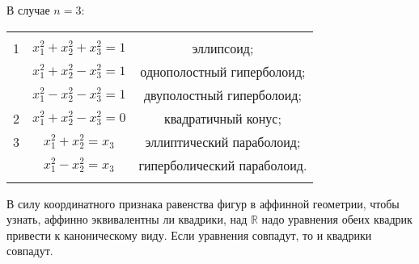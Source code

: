 \documentclass[draft]{article}%
\renewcommand{\c}{\mathbb{C}}
\newcommand{\eps}{\varepsilon}
\newcommand{\pr}{{\rm pr\,}}%
\newcommand{\rk}{{\rm rk\,}}%
\newcommand{\de}{\par\noindent\underline{Def}.\ }%
\newcommand{\ab}{\par\noindent}%
\newcommand{\te}{\par\noindent{\bf Теорема.}\ }%
\newcommand{\dok}{\par\noindent{\textsl{Доказательство}.}\ }%
\newcommand{\qed}{\quad${{\bf Q.E.D.}}$}
\renewcommand{\phi}{\varphi}
\newcommand{\sled}{\par\noindent{\bf Следствие.}\ }%
\newcommand{\baz}[1]{\left(#1_1,\dots,#1_n\right)}%
\newcommand{\lr}{\Leftrightarrow}%
\newcommand{\nn}[1]{#1_1,#1_2,\dots,#1_n}%
\newcommand{\lob}[1]{\left\langle#1\right\rangle}%
\newcommand{\ps}{\oplus}
\newcommand{\rom}[1]{{\rm#1\,}}
\newcommand{\op}[1]{$\mathcal{#1}$}
\newcommand{\om}[1]{\mathcal{#1}}
\newcommand{\oi}[1]{\overrightarrow{#1}}%
\begin{document}
\ab
В случае $n=3$:\ab
\begin{tabular}{ccc}

& & \\
  1 & $x_1^2+x_2^2+x_3^2=1$ & эллипсоид; \\

   & $x_1^2+x_2^2-x_3^2=1$ & однополостный гиперболоид; \\
   & $x_1^2-x_2^2-x_3^2=1$ & двуполостный гиперболоид; \\
  2 & $x_1^2+x_2^2-x_3^2=0$ & квадратичный конус;\\
  3 & $x_1^2+x_2^2=x_3$ & эллиптический параболоид; \\
   & $x_1^2-x_2^2=x_3$ & гиперболический параболоид. \\
& & \\
\end{tabular}
\ab
В силу координатного признака равенства фигур в аффинной геометрии, чтобы узнать, аффинно эквивалентны ли квадрики,
над $\mathbb{R}$ надо уравнения обеих квадрик привести к каноническому виду. Если уравнения совпадут, то и квадрики совпадут.

%
\end{document}
